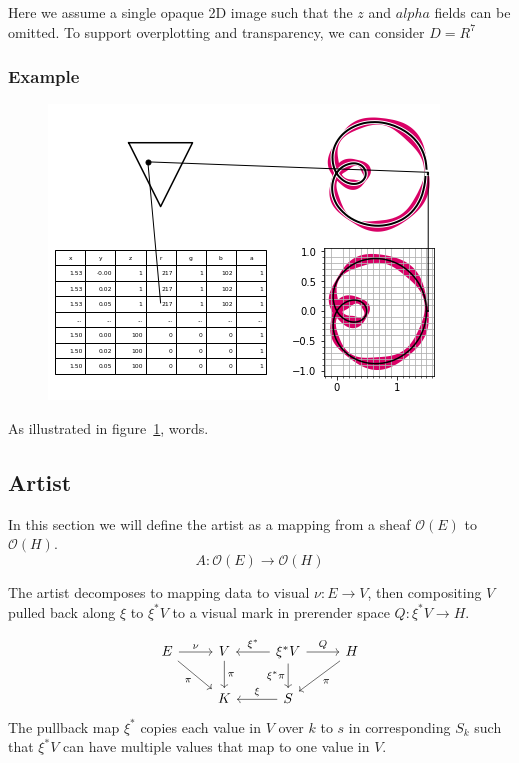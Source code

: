 \documentclass[../main.tex]{subfiles}
\begin{document}
Here we assume a single opaque 2D image such that the $z$ and $alpha$ fields can be omitted. To support overplotting and transparency, we can consider $D=R^{7}$

\subsubsection{{Example}}
\begin{figure}[h!]
    \includegraphics[width=.4\linewidth]{figures/math/render.png}
    \caption{}
    \label{fig:render}
\end{figure}

As illustrated in figure~\ref{fig:render}, words.

\subsection{Artist}
\label{sec:artist}

In this section we will define the artist as a mapping from a sheaf $\mathcal{O}(E)$  to $\mathcal{O}(H)$. 
\begin{equation}
    A: \mathcal{O}(E) \rightarrow \mathcal{O}(H)
\end{equation}

The artist decomposes to mapping data to visual $\nu:E\rightarrow V$, then  compositing $V$ pulled back along $\xi$ to $\xi^*V$ to a visual mark in prerender space $Q:\xi^*V\rightarrow H$. 

\begin{equation}
    \label{eq:artist}
    \begin{tikzcd}
        E \arrow[r, "\nu"] \arrow[rd, "\pi"'] & V \arrow[d, "\pi"] & \xi^*V \arrow[r, "Q"] \arrow[d, "\xi^*\pi"'] \arrow[l, "\xi^*"'] & H \arrow[ld, "\pi"] \\
                                              & K                  & S \arrow[l, "\xi"']                                              &                    
        \end{tikzcd}
\end{equation}
The pullback map $\xi^*$ copies each value in $V$ over $k$ to $s$ in corresponding $S_k$ such that $\xi^*V$ can have multiple values that map to one value in $V$. 
\end{document}
